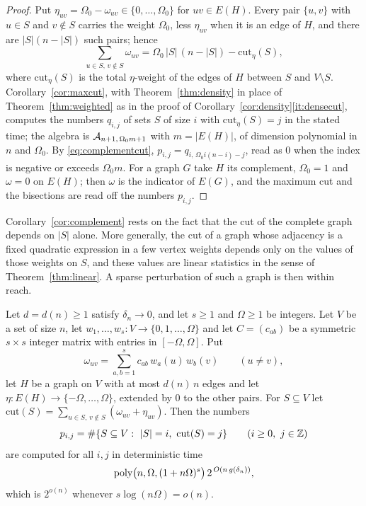 \begin{proof}
Put $\eta_{uv}=\Omega_0-\omega_{uv}\in\{0,\dots,\Omega_0\}$ for $uv\in E(H)$. Every pair
$\{u,v\}$ with $u\in S$ and $v\notin S$ carries the weight $\Omega_0$, less
$\eta_{uv}$ when it is an edge of $H$, and there are $|S|(n-|S|)$ such pairs; hence
\begin{equation}\label{eq:complementcut}
  \sum_{u\in S,\,v\notin S}\omega_{uv}=\Omega_0\,|S|\,(n-|S|)-\mathrm{cut}_\eta(S),
\end{equation}
where $\mathrm{cut}_\eta(S)$ is the total $\eta$-weight of the edges of $H$ between $S$
and $V\setminus S$. Corollary~\ref{cor:maxcut}, with Theorem~\ref{thm:density} in place
of Theorem~\ref{thm:weighted} as in the proof of Corollary~\ref{cor:density}\ref{it:densecut},
computes the numbers $q_{i,j}$ of sets $S$ of size $i$ with $\mathrm{cut}_\eta(S)=j$ in
the stated time; the algebra is $\mathcal{A}_{n+1,\,\Omega_0m+1}$ with $m=|E(H)|$, of dimension
polynomial in $n$ and $\Omega_0$. By \eqref{eq:complementcut},
$p_{i,j}=q_{i,\,\Omega_0i(n-i)-j}$, read as $0$ when the index is negative or exceeds
$\Omega_0 m$. For a graph $G$ take $H$ its complement, $\Omega_0=1$ and $\omega=0$ on
$E(H)$; then $\omega$ is the indicator of $E(G)$, and the maximum cut and the bisections
are read off the numbers $p_{i,j}$.
\end{proof}

Corollary~\ref{cor:complement} rests on the fact that the cut of the complete graph
depends on $|S|$ alone. More generally, the cut of a graph whose adjacency is a
fixed quadratic expression in a few vertex weights depends only on the values of
those weights on $S$, and these values are linear statistics in the sense of
Theorem~\ref{thm:linear}. A sparse perturbation of such a graph is then within reach.

\begin{theorem}\label{thm:lowrank}
Let $d=d(n)\ge1$ satisfy $\delta_n\to0$, and let $s\ge1$ and $\Omega\ge1$ be integers.
Let $V$ be a set of size $n$, let $w_1,\dots,w_s:V\to\{0,1,\dots,\Omega\}$ and let
$C=(c_{ab})$ be a symmetric $s\times s$ integer matrix with entries in
$[-\Omega,\Omega]$. Put
\[
  \omega_{uv}=\sum_{a,b=1}^{s}c_{ab}\,w_a(u)\,w_b(v)\qquad(u\ne v),
\]
let $H$ be a graph on $V$ with at most $d(n)\,n$ edges and let
$\eta:E(H)\to\{-\Omega,\dots,\Omega\}$, extended by $0$ to the other pairs. For
$S\subseteq V$ let $\mathrm{cut}(S)=\sum_{u\in S,\,v\notin S}(\omega_{uv}+\eta_{uv})$.
Then the numbers
\[
  p_{i,j}=\#\{S\subseteq V:\ |S|=i,\ \mathrm{cut}(S)=j\}\qquad(i\ge0,\ j\in\Z)
\]
are computed for all $i,j$ in deterministic time
\[
  \operatorname{poly}\bigl(n,\Omega,(1+n\Omega)^{s}\bigr)\,2^{\,O(n\,g(\delta_n))},
\]
which is $2^{o(n)}$ whenever $s\log(n\Omega)=o(n)$.
\end{theorem}

